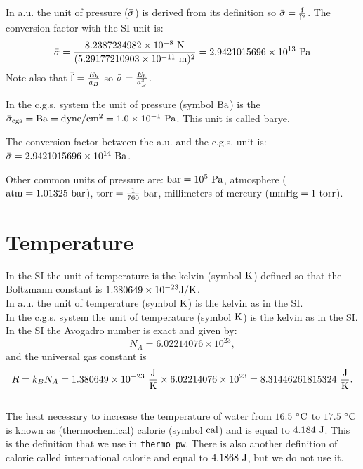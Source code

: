 \documentclass[12pt,a4paper,twoside]{report}
\def\tpw{\texttt{thermo\_pw}}
\def\avonum{6.02214076\times 10^{23}}
\def\kb{1.380649\times 10^{-23}}
\def\rgas{8.31446261815324}
\def\barl{5.29177210903\times 10^{-11}}
\def\barf{8.2387234982\times 10^{-8}}
\def\barpr{2.9421015696\times 10^{13}}
\def\prtopr{1.0\times 10^{-1}}
\def\barprcgs{2.9421015696\times 10^{14}}
\begin{document}
{\color{web-blue} In a.u. the unit of pressure (${\rm \bar \sigma}$) is derived from 
its definition so ${\rm \bar \sigma}= {{\rm \bar f} \over {\rm \bar l}^2}$. The conversion
factor with the SI unit is:
\begin{equation}
{\rm \bar \sigma}= {\barf\ {\rm N} \over (\barl\ {\rm m} )^2}=\barpr\ {\rm Pa}
\end{equation}
Note also that ${\rm \bar f} = {E_h \over a_B}$ so 
${\rm \bar \sigma} = {E_h \over a_B^3}$.
}

{\color{orange} In the c.g.s. system the unit of pressure (symbol ${\rm Ba}$)
is the ${\rm \bar \sigma_{cgs}}={\rm Ba}={\rm dyne}/{\rm cm}^2 = \prtopr\ {\rm Pa}$. This unit is 
called barye. 
\\
}

{\color{green} The conversion factor between the a.u. and the c.g.s. unit is:
${\rm \bar \sigma}=\barprcgs\ {\rm Ba}$.
\\
}

{\color{red} Other common units of pressure are:
${\rm bar}=10^5\ {\rm Pa}$, atmosphere (${\rm atm}=1.01325\ {\rm bar}$), ${\rm torr}= {1\over 760}\ {\rm bar}$, 
millimeters of mercury (${\rm mmHg}=1\ {\rm torr}$).
}

\newpage
{\color{coral}\section{Temperature}}
\color{black}
In the SI the unit of temperature is the kelvin (symbol ${\rm K}$) defined
so that the Boltzmann constant is $\kb {\rm J} / {\rm K}$.
\\

{\color{web-blue} In a.u. the unit of temperature (symbol ${\rm K}$) is the 
kelvin as in the SI.}
\\

{\color{orange} In the c.g.s. system the unit of temperature 
(symbol ${\rm K}$) 
is the kelvin as in the SI.}
\\

{\color{red} In the SI the Avogadro number is exact and given by:
\begin{equation}
N_A=\avonum,
\end{equation}
and the universal gas constant is 
\begin{equation}
R=k_B N_A = \kb\ {{\rm J}\over {\rm K}} \times \avonum = \rgas\ {{\rm J}
\over {\rm K}}.
\end{equation}
\\

The heat necessary to increase the temperature of water from $16.5$ 
$^\circ{\rm C}$
to $17.5$ $^\circ{\rm C}$ is known as (thermochemical) calorie 
(symbol ${\rm cal}$) and 
is equal to $4.184\ {\rm J}$. This is the definition that we use in \tpw. 
There is also another definition of calorie called international calorie and
equal to $4.1868\ {\rm J}$, but we do not use it.
}
\end{document}
